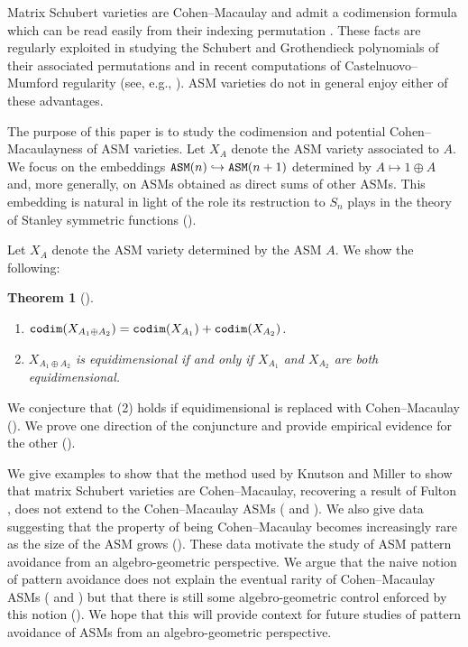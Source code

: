 \documentclass[12 pt]{amsart}
\DeclareMathOperator{\codim}{{\tt codim}}
\DeclareMathOperator{\asm}{\tt ASM}
\theoremstyle{plain}
\newtheorem{thm}{Theorem}[section]
\theoremstyle{definition}
\theoremstyle{remark}
\begin{document}
Matrix Schubert varieties are Cohen--Macaulay and admit a codimension formula which can be read easily from their indexing permutation \cite{Ful92}.  These facts are regularly exploited in studying the Schubert and Grothendieck polynomials of their associated permutations and in recent computations of Castelnuovo--Mumford regularity (see, e.g., \cite{RRRSDW21, PSW24}).  ASM varieties do not in general enjoy either of these advantages.

The purpose of this paper is to study the codimension and potential Cohen--Macaulayness of ASM varieties.  Let $X_A$ denote the ASM variety associated to $A$.  We focus on the embeddings $\asm(n) \hookrightarrow \asm(n+1)$ determined by $A \mapsto 1 \oplus A$ and, more generally, on ASMs obtained as direct sums of other ASMs.  This embedding is natural in light of the role its restruction to $S_n$ plays in the theory of Stanley symmetric functions (\cite{Sta84, Mac91}).

Let $X_A$ denote the ASM variety determined by the ASM $A$.  We show the following:

\begin{thm}[]
\hspace{1cm}

    \begin{enumerate}
        \item $\codim(X_{A_1 \oplus A_2}) = \codim(X_{A_1}) + \codim(X_{A_2})$.
        \item $X_{A_1 \oplus A_2}$ is equidimensional if and only if $X_{A_1}$ and $X_{A_2}$ are both equidimensional.
    \end{enumerate}
\end{thm}

We conjecture that (2) holds if equidimensional is replaced with Cohen--Macaulay ().  We prove one direction of the conjuncture and provide empirical evidence for the other ().

We give examples to show that the method used by Knutson and Miller \cite{KM05} to show that matrix Schubert varieties are Cohen--Macaulay, recovering a result of Fulton \cite{Ful92}, does not extend to the Cohen--Macaulay ASMs ( and ).  We also give data suggesting that the property of being Cohen--Macaulay becomes increasingly rare as the size of the ASM grows ().  These data motivate the study of ASM pattern avoidance from an algebro-geometric perspective.  We argue that the naive notion of pattern avoidance does not explain the eventual rarity of Cohen--Macaulay ASMs ( and ) but that there is still some algebro-geometric control enforced by this notion ().  We hope that this will provide context for future studies of pattern avoidance of ASMs from an algebro-geometric perspective.
\end{document}
